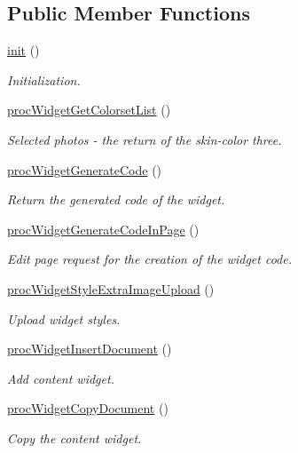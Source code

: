 \subsection*{Public Member Functions}
\begin{DoxyCompactItemize}
\item 
\hyperlink{classwidgetController_aa76890b678d4f18898dc1bed68730eae}{init} ()
\begin{DoxyCompactList}\small\item\em Initialization. \end{DoxyCompactList}\item 
\hyperlink{classwidgetController_a1ea3fa6a1799d8d1190eeeba8424df04}{proc\+Widget\+Get\+Colorset\+List} ()
\begin{DoxyCompactList}\small\item\em Selected photos -\/ the return of the skin-\/color three. \end{DoxyCompactList}\item 
\hyperlink{classwidgetController_ab914871b42db6378aa78aa682daea6a3}{proc\+Widget\+Generate\+Code} ()
\begin{DoxyCompactList}\small\item\em Return the generated code of the widget. \end{DoxyCompactList}\item 
\hyperlink{classwidgetController_a0e6483bd8d30255e5cea027b46fc9288}{proc\+Widget\+Generate\+Code\+In\+Page} ()
\begin{DoxyCompactList}\small\item\em Edit page request for the creation of the widget code. \end{DoxyCompactList}\item 
\hyperlink{classwidgetController_a0abe619fbf8376e7829ade6996c3f707}{proc\+Widget\+Style\+Extra\+Image\+Upload} ()
\begin{DoxyCompactList}\small\item\em Upload widget styles. \end{DoxyCompactList}\item 
\hyperlink{classwidgetController_a2704aca7d4721e2f48c87c47fd2f192b}{proc\+Widget\+Insert\+Document} ()
\begin{DoxyCompactList}\small\item\em Add content widget. \end{DoxyCompactList}\item 
\hyperlink{classwidgetController_a79adfc9bc627022de039909a2139d510}{proc\+Widget\+Copy\+Document} ()
\begin{DoxyCompactList}\small\item\em Copy the content widget. \end{DoxyCompactList}\item 

\end{DoxyCompactItemize}
